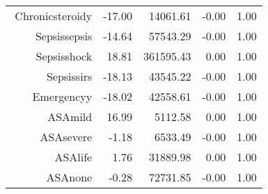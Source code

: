 \begin{tabular}{rrrrr}
$$  Chronic\-steroid\-y & -17.00 & 14061.61 & -0.00 & 1.00 \\ 
  Sepsis\-sepsis & -14.64 & 57543.29 & -0.00 & 1.00 \\ 
  Sepsis\-shock & 18.81 & 361595.43 & 0.00 & 1.00 \\ 
  Sepsis\-sirs & -18.13 & 43545.22 & -0.00 & 1.00 \\ 
  Emergency\-y & -18.02 & 42558.61 & -0.00 & 1.00 \\ 
  ASA\-mild & 16.99 & 5112.58 & 0.00 & 1.00 \\ 
  ASA\-severe & -1.18 & 6533.49 & -0.00 & 1.00 \\ 
  ASA\-life & 1.76 & 31889.98 & 0.00 & 1.00 \\ 
  ASA\-none & -0.28 & 72731.85 & -0.00 & 1.00 \\ 
   \hline
\end{tabular}

